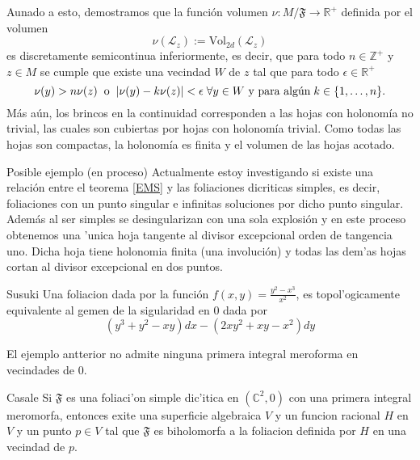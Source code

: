 \documentclass[letterpaper]{beamer}
\newcommand{\zah}{\ensuremath{ \mathbb Z }}
\newcommand{\co}{\ensuremath{\mathbb C }}
\newcommand{\re}{\ensuremath{\mathbb R }}
\begin{document}
\begin{frame}
Aunado a esto, demostramos que la funci\'on volumen $\nu:M/\mathfrak{F}\rightarrow\re^{+}$ definida por el volumen
\[
        \nu(\mathcal{L}_z):=\textrm{Vol}_{2d}(\mathcal{L}_z)
\]
es discretamente semicontinua inferiormente, es decir, que para todo $n\in\zah^{+}$ y $z\in M$ se cumple que existe una vecindad $W$ de $z$
tal que para todo $\epsilon\in\re^{+}$
\[
        \nu(y)>n\nu(z)\hspace{0.2cm}\text{o}\hspace{0.2cm}|\nu(y)-k\nu(z)|<\epsilon\hspace{0.1cm}\forall y\in W\text{ y para alg\'un}\hspace{0.1cm}k\in\{1,\dots,n\}.
\]
\noindent M\'as a\'un, los brincos en la continuidad corresponden a las hojas con holonom\'ia no trivial, las cuales son cubiertas
por hojas con holonom\'ia trivial. Como todas las hojas son compactas, la holonom\'ia es finita y el volumen de las hojas acotado.
\end{frame}
\begin{frame}
  \begin{block}{Posible ejemplo (en proceso)}
    Actualmente estoy investigando si existe una relación entre el teorema \ref{EMS} y las foliaciones dicriticas simples, es decir, foliaciones con un punto
    singular e infinitas soluciones por dicho punto singular. Adem\'as al ser simples se desingularizan con una sola explosi\'on y en este proceso obtenemos una
    'unica hoja tangente al divisor excepcional orden de tangencia uno. Dicha hoja tiene holonomia finita (una involuci\'on) y todas las dem'as hojas cortan  al  divisor excepcional en dos puntos.
  \end{block}
\end{frame}
\begin{frame}
\begin{block}{Susuki}
  Una foliacion dada por la funci\'on $f(x,y)=\frac{y^{2}-x^{3}}{x^{2}}$, es topol'ogicamente equivalente al gemen
  de la sigularidad en $0$ dada por
        \[
        (y^{3}+y^{2}-xy)dx-(2xy^{2}+xy-x^{2})dy
      \]
      {
      \centering
      
      \par
    }
    \end{block}
\end{frame}
\begin{frame}
  El ejemplo antterior no admite ninguna primera integral meroforma en vecindades de $0$.
  \begin{block}{Casale}
    Si $\mathfrak{F}$ es una foliaci'on simple dic'itica en $(\co^{2},0)$ con una primera integral meromorfa, entonces exite una superficie algebraica $V$ y un
    funcion racional $H$ en $V$ y un punto $p\in V$ tal que $\mathfrak{F}$ es biholomorfa a la foliacion definida por $H$ en una vecindad de $p$.
    \end{block}
  \end{frame}
\end{document}
